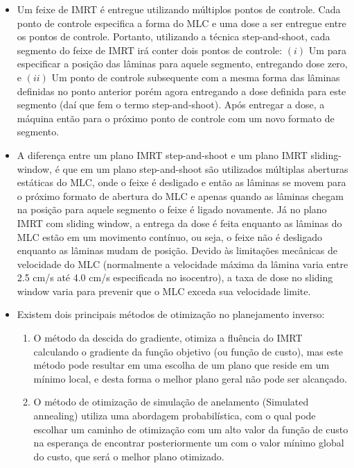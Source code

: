\documentclass[11pt,a4paper]{article}
\newcounter{exemplo}
\begin{document}
\begin{exemplo}
\begin{itemize}
        \item Um feixe de IMRT é entregue utilizando múltiplos pontos de controle. Cada ponto de controle especifica a forma do MLC e uma dose a ser entregue entre os pontos de controle. Portanto, utilizando a técnica \textcolor{CarnationPink}{step-and-shoot}, cada segmento do feixe de IMRT irá conter dois pontos de controle: $(i)$ Um para especificar a posição das lâminas para aquele segmento, entregando dose zero, e $(ii)$ Um ponto de controle subsequente com a mesma forma das lâminas definidas no ponto anterior  porém agora entregando a dose definida para este segmento (daí que fem o termo step-and-shoot). Após entregar a dose, a máquina então para o próximo ponto de controle com um novo formato de segmento.
        
        \item A diferença entre um plano IMRT step-and-shoot e um plano IMRT sliding-window, é que em um plano step-and-shoot são utilizados múltiplas aberturas estáticas do MLC, onde o feixe é desligado e então as lâminas se movem para o próximo formato de abertura do MLC e apenas quando as lâminas chegam na posição para aquele segmento o feixe é ligado novamente. Já no plano IMRT com sliding window, a entrega da dose é feita enquanto as lâminas do MLC estão em um movimento contínuo, ou seja, o feixe não é desligado enquanto as lâminas mudam de posição. Devido às limitações mecânicas de velocidade do MLC (normalmente a velocidade máxima da lâmina varia entre 2.5 cm/s até 4.0 cm/s especificada no isocentro), a taxa de dose no sliding window varia para prevenir que o MLC exceda sua velocidade limite.
        
        \item Existem dois principais métodos de otimização no planejamento inverso:
        
            \begin{enumerate}
                \item O método da descida do gradiente, otimiza a fluência do IMRT calculando o gradiente da função objetivo (ou função de custo), mas este método pode resultar em uma escolha de um plano que reside em um mínimo local, e desta forma o melhor plano geral não pode ser alcançado.
                
                \item O método de otimização de simulação de anelamento (Simulated annealing) utiliza uma abordagem probabilística, com o qual pode escolhar um caminho de otimização com um alto valor da função de custo na esperança de encontrar posteriormente um com o valor mínimo global do custo, que será o melhor plano otimizado.
            \end{enumerate}


\end{itemize}
\end{exemplo}
\end{document}
